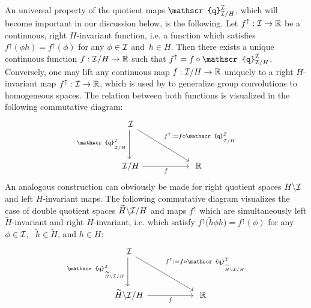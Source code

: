 An universal property of the quotient maps $\mathscr{q}^{\I}_{\I/H}$, which will become important in our discussion below, is the following.
Let $f^\uparrow: \mathcal{I} \to \mathbb{R}$ be a continuous, right $H$-invariant function, i.e. a function which satisfies $f^\uparrow(\phi h) = f^\uparrow(\phi)$ for any $\phi\in\mathcal{I}$ and~$h\in H$.
Then there exists a unique continuous function $f: \mathcal{I}/H \to \mathbb{R}$ such that $f^\uparrow = f \circ \mathscr{q}^{\I}_{\I/H}$.
Conversely, one may lift any continuous map $f: \mathcal{I}/H \to \mathbb{R}$ uniquely to a right $H$-invariant map $f^\uparrow: \mathcal{I} \to \mathbb{R}$, which is used by \citet{Kondor2018-GENERAL} to generalize group convolutions to homogeneous spaces.
The relation between both functions is visualized in the following commutative diagram:
\begin{equation}
\label{cd:left_cosets_lift}
\begin{tikzcd}[column sep=55pt, row sep=35pt, font=\normalsize]
    \I
        \arrow[rd, "\!f^\uparrow := f\circ \mathscr{q}^{\I}_{\overset{}{\I/H}}"]
        \arrow[d, "\mathscr{q}^{\I}_{\overset{}{\I/H}}\,"']
    \\
    \I/H
        \arrow[r, "f"']
    & \R
\end{tikzcd}
\end{equation}
An analogous construction can obviously be made for right quotient spaces $H\backslash\mathcal{I}$ and left $H$-invariant maps.
The following commutative diagram visualizes the case of double quotient spaces $\widetilde{H} \backslash \mathcal{I}/H$ and maps $f^\uparrow$ which are simultaneously left $\widetilde{H}$-invariant and right $H$-invariant, i.e. which satisfy ${f^\uparrow\big(\widetilde{h}\phi h\big) = f^\uparrow(\phi)}$ for any ${\phi\in\mathcal{I}}$, \ ${\widetilde{h}\in\widetilde{H}}$, and ${h\in H}$:
\begin{equation}
\label{cd:double_cosets_lift}
\begin{tikzcd}[column sep=55pt, row sep=35pt, font=\normalsize]
    \I
        \arrow[rd, "\!f^\uparrow := f\circ \mathscr{q}^{\I}_{\overset{}{\widetilde{H} \backslash \I/H}}"]
        \arrow[d, "\mathscr{q}^{\I}_{\overset{}{\widetilde{H} \backslash \I/H}}\,"']
    \\
    \widetilde{H} \backslash \I/H
        \arrow[r, "f"']
    & \R
\end{tikzcd}
\end{equation}




